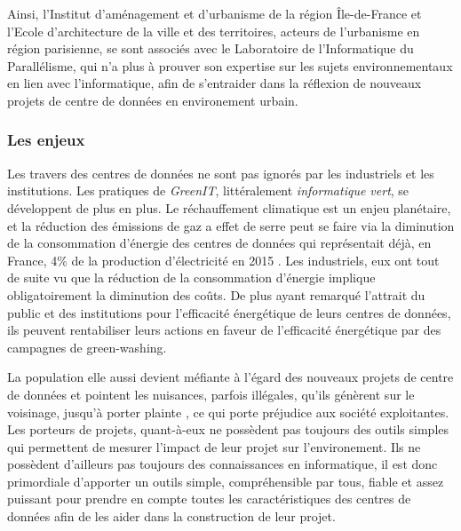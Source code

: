 Ainsi, l'Institut d'aménagement et d'urbanisme de la région Île-de-France et l'Ecole d'architecture de la ville et des territoires, acteurs de l'urbanisme en région parisienne, se sont associés avec le Laboratoire de l'Informatique du Parallélisme, qui n'a plus à prouver son expertise sur les sujets environnementaux en lien avec l'informatique, afin de s'entraider dans la réflexion de nouveaux projets de centre de données en environement urbain.

\subsubsection{Les enjeux}
Les travers des centres de données ne sont pas ignorés par les industriels et les institutions. Les pratiques de \emph{GreenIT}, littéralement \emph{informatique vert}, se développent de plus en plus. Le réchauffement climatique est un enjeu planétaire, et la réduction des émissions de gaz a effet de serre peut se faire via la diminution de la consommation d'énergie des centres de données qui représentait déjà, en France, 4\% de la production d'électricité en 2015 \cite{percentageElectricite}. Les industriels, eux ont tout de suite vu que la réduction de la consommation d'énergie implique obligatoirement la diminution des coûts. De plus ayant remarqué l'attrait du public et des institutions pour l'efficacité énergétique de leurs centres de données, ils peuvent rentabiliser leurs actions en faveur de l'efficacité énergétique par des campagnes de green-washing.

La population elle aussi devient méfiante à l'égard des nouveaux projets de centre de données et pointent les nuisances, parfois illégales, qu'ils génèrent sur le voisinage, jusqu'à porter plainte \cite{plainte}, ce qui porte préjudice aux société exploitantes.\\

Les porteurs de projets, quant-à-eux ne possèdent pas toujours des outils simples qui permettent de mesurer l'impact de leur projet sur l'environement. Ils ne possèdent d'ailleurs pas toujours des connaissances en informatique, il est donc primordiale d'apporter un outils simple, compréhensible par tous, fiable et assez puissant pour prendre en compte toutes les caractéristiques des centres de données afin de les aider dans la construction de leur projet.

